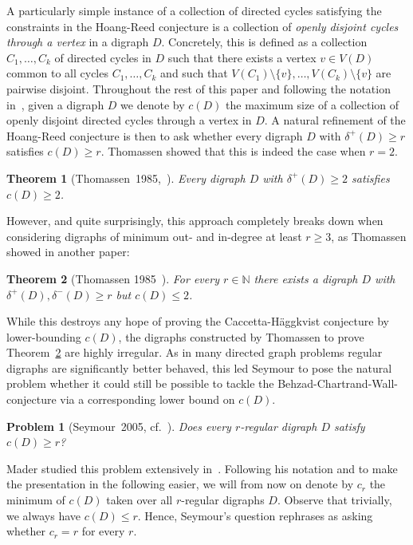 \documentclass[a4paper,10pt]{article}
\newtheorem{theorem}{Theorem}
\newtheorem{problem}{Problem}
\begin{document}
A particularly simple instance of a collection of directed cycles satisfying the constraints in the Hoang-Reed conjecture is a collection of \emph{openly disjoint cycles through a vertex} in a digraph $D$. Concretely, this is defined as a collection $C_1,\ldots,C_k$ of directed cycles in $D$ such that there exists a vertex $v\in V(D)$ common to all cycles $C_1,\ldots,C_k$ and such that $V(C_1)\setminus \{v\},\ldots, V(C_k)\setminus \{v\}$ are pairwise disjoint. Throughout the rest of this paper and following the notation in~\cite{MR2588727,MR2672214}, given a digraph $D$ we denote by $c(D)$ the maximum size of a collection of openly disjoint directed cycles through a vertex in $D$. A natural refinement of the Hoang-Reed conjecture is then to ask whether every digraph $D$ with $\delta^+(D)\ge r$ satisfies $c(D)\ge r$. Thomassen showed that this is indeed the case when $r=2$. \begin{theorem}[Thomassen~1985,~\cite{MR793632}]
Every digraph $D$ with $\delta^+(D)\ge 2$ satisfies $c(D)\ge 2$. 
\end{theorem}
However, and quite surprisingly, this approach completely breaks down when considering digraphs of minimum out- and in-degree at least $r\ge 3$, as Thomassen showed in another paper:

\begin{theorem}[Thomassen 1985~\cite{MR793491}]\label{thm:thomassenconstruction}
For every $r\in\mathbb{N}$ there exists a digraph $D$ with $\delta^+(D),\delta^-(D)\ge r$ but $c(D)\le 2$.
\end{theorem}

While this destroys any hope of proving the Caccetta-Häggkvist conjecture by lower-bounding $c(D)$, the digraphs constructed by Thomassen to prove Theorem~\ref{thm:thomassenconstruction} are highly irregular. As in many directed graph problems regular digraphs are significantly better behaved, this led Seymour to pose the natural problem whether it could still be possible to tackle the Behzad-Chartrand-Wall-conjecture via a corresponding lower bound on $c(D)$.
\begin{problem}[Seymour~2005, cf.~\cite{MR2588727,MR2672214}]\label{prob:seym}
Does every $r$-regular digraph $D$ satisfy $c(D)\ge r$?
\end{problem}

Mader studied this problem extensively in~\cite{MR2588727,MR2672214}. Following his notation and to make the presentation in the following easier, we will from now on denote by $c_r$ the minimum of $c(D)$ taken over all $r$-regular digraphs $D$. Observe that trivially, we always have $c(D)\le r$. Hence, Seymour's question rephrases as asking whether $c_r=r$ for every $r$.
\end{document}
